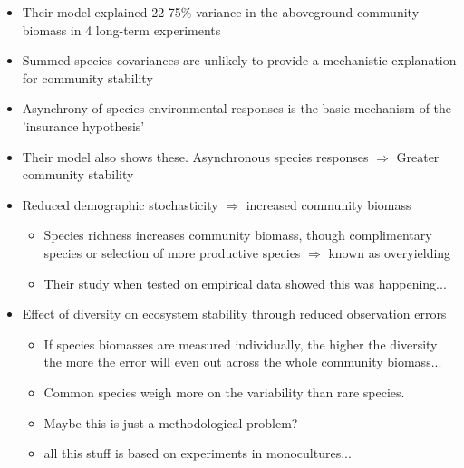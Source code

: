 \begin{itemize}
	\item Their model explained 22-75\% variance in the aboveground community biomass in 4 long-term experiments
	\item Summed species covariances are unlikely to provide a mechanistic explanation for community stability
	\item Asynchrony of species environmental responses is the basic mechanism of the 'insurance hypothesis'
	\item Their model also shows these. Asynchronous species responses $\Rightarrow$ Greater community stability
	\item Reduced demographic stochasticity $\Rightarrow$ increased community biomass
	\begin{itemize}
		\item Species richness increases community biomass, though complimentary species or selection of more productive species $\Rightarrow$ known as overyielding
		\item Their study when tested on empirical data showed this was happening...
	\end{itemize}
	\item Effect of diversity on ecosystem stability through reduced observation errors
	\begin{itemize}
		\item If species biomasses are measured individually, the higher the diversity the more the error will even out across the whole community biomass...
		\item Common species weigh more on the variability than rare species.
		\item Maybe this is just a methodological problem?
		\item all this stuff is based on experiments in monocultures...
	\end{itemize}
\end{itemize}